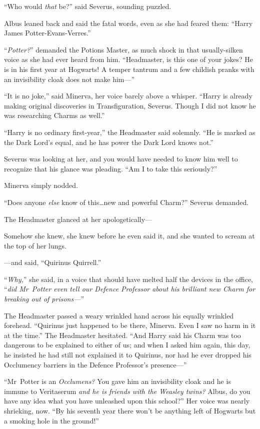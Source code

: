 “Who would \emph{that} be?” said Severus, sounding puzzled.

Albus leaned back and said the fatal words, even as she had feared them: “Harry James Potter-Evans-Verres.”

“\emph{Potter?}” demanded the Potions Master, as much shock in that usually-silken voice as she had ever heard from him. “Headmaster, is this one of your jokes? He is in his first year at Hogwarts! A temper tantrum and a few childish pranks with an invisibility cloak does not make him—”

“It is no joke,” said Minerva, her voice barely above a whisper. “Harry is already making original discoveries in Transfiguration, Severus. Though I did not know he was researching Charms as well.”

“Harry is no ordinary first-year,” the Headmaster said solemnly. “He is marked as the Dark Lord’s equal, and he has power the Dark Lord knows not.”

Severus was looking at her, and you would have needed to know him well to recognize that his glance was pleading. “Am I to take this seriously?”

Minerva simply nodded.

“Does anyone \emph{else} know of this…new and powerful Charm?” Severus demanded.

The Headmaster glanced at her apologetically—

Somehow she knew, she knew before he even said it, and she wanted to scream at the top of her lungs.

—and said, “Quirinus Quirrell.”

“\emph{Why,}” she said, in a voice that should have melted half the devices in the office, “\emph{did Mr~Potter even \emph{tell} our Defence Professor about his brilliant new Charm for breaking out of prisons—}”

The Headmaster passed a weary wrinkled hand across his equally wrinkled forehead. “Quirinus just happened to be there, Minerva. Even I saw no harm in it at the time.” The Headmaster hesitated. “And Harry said his Charm was too dangerous to be explained to either of us; and when I asked him again, this day, he insisted he had still not explained it to Quirinus, nor had he ever dropped his Occlumency barriers in the Defence Professor’s presence—”

“Mr~Potter is an \emph{Occlumens?} You gave him an invisibility cloak and he is immune to Veritaserum \emph{and he is friends with the Weasley twins?} Albus, do you have any idea what you have unleashed upon this school?” Her voice was nearly shrieking, now. “By his seventh year there won’t be anything left of Hogwarts but a smoking hole in the ground!”

